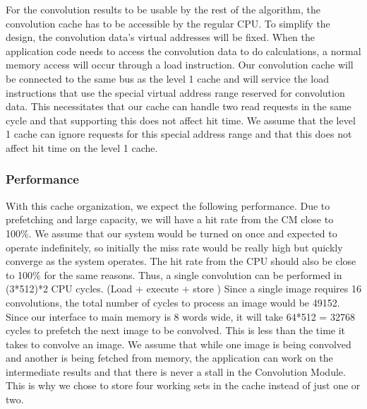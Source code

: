For the convolution results to be usable by the rest of the algorithm, the convolution cache has to be accessible by the regular CPU. To simplify the design, the convolution data's virtual addresses will be fixed. When the application code needs to access the convolution data to do calculations, a normal memory access will occur through a load instruction. Our convolution cache will be connected to the same bus as the level 1 cache and will service the load instructions that use the special virtual address range reserved for convolution data. This necessitates that our cache can handle two read requests in the same cycle and that supporting this does not affect hit time. We assume that the level 1 cache can ignore requests for this special address range and that this does not affect hit time on the level 1 cache.

\subsubsection{Performance}
With this cache organization, we expect the following performance. Due to prefetching and large capacity, we will have a hit rate from the CM close to 100\%. We assume that our system would be turned on once and expected to operate indefinitely, so initially the miss rate would be really high but quickly converge as the system operates. The hit rate from the CPU should also be close to 100\% for the same reasons. Thus, a single convolution can be performed in (3*512)*2 CPU cycles. (Load + execute + store ) Since a single image requires 16 convolutions, the total number of cycles to process an image would be 49152. Since our interface to main memory is 8 words wide, it will take 64*512  = 32768 cycles to prefetch the next image to be convolved. This is less than the time it takes to convolve an image. We assume that while one image is being convolved and another is being fetched from memory, the application can work on the intermediate results and that there is never a stall in the Convolution Module. This is why we chose to store four working sets in the cache instead of just one or two.
